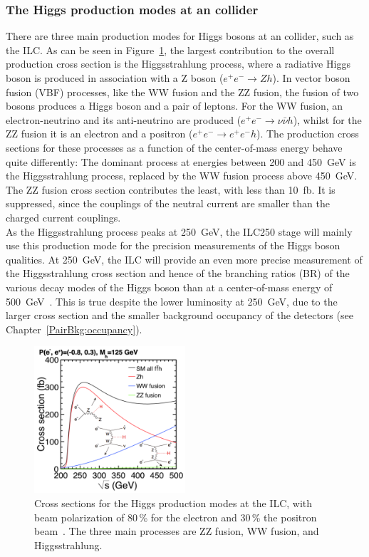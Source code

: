 \subsubsection{The Higgs production modes at an \positron\electron collider}
There are three main production modes for Higgs bosons at an \positron\electron collider, such as the ILC.
As can be seen in Figure~\ref{fig:HiggsProduction}, the largest contribution to the overall production cross section is the Higgsstrahlung process, where a radiative Higgs boson is produced in association with a Z boson ($e^+e^-\rightarrow Zh$).
In vector boson fusion (VBF) processes, like the WW fusion and the ZZ fusion, the fusion of two bosons produces a Higgs boson and a pair of leptons.
For the WW fusion, an electron-neutrino and its anti-neutrino are produced ($e^+e^-\rightarrow \nu\bar{\nu} h$), whilst for the ZZ fusion it is an electron and a positron ($e^+e^-\rightarrow e^+e^-h$).
The production cross sections for these processes as a function of the center-of-mass energy behave quite differently:
The dominant process at energies between 200 and \SI{450}{\GeV} is the Higgsstrahlung process, replaced by the WW fusion process above \SI{450}{\GeV}.
The ZZ fusion cross section contributes the least, with less than \SI{10}{fb}.
It is suppressed, since the couplings of the neutral current are smaller than the charged current couplings.\\
As the Higgsstrahlung process peaks at \SI{250}{\GeV}, the ILC250 stage will mainly use this production mode for the precision measurements of the Higgs boson qualities.
At \SI{250}{\GeV}, the ILC will provide an even more precise measurement of the Higgsstrahlung cross section and hence of the branching ratios (BR) of the various decay modes of the Higgs boson than at a center-of-mass energy of \SI{500}{\GeV}~\cite[p. 14]{PhysicsCase}.
This is true despite the lower luminosity at \SI{250}{\GeV}, due to the larger cross section and the smaller background occupancy of the detectors (see Chapter~\ref{PairBkg:occupancy}).
\begin{figure}
\centering
\includegraphics[width=0.5\textwidth]{Figures/HiggsProductionCrossSection.png}
\caption[Cross section for the Higgs production modes at ILC]{Cross sections for the Higgs production modes at the ILC, with beam polarization of 80\,\% for the electron and 30\,\% the positron beam~\cite[p. 13]{PhysicsCase}.
The three main processes are ZZ fusion, WW fusion, and Higgsstrahlung.}
\label{fig:HiggsProduction}
\end{figure}

